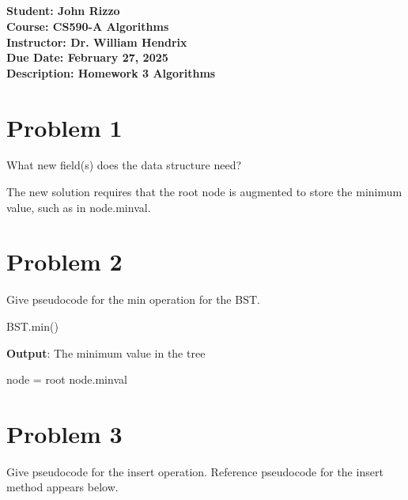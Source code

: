 \documentclass[12pt, letterpaper]{article}
\title{\classname \\ \assignmentdescription}
\author{\studentname}
\date{\duedate}
\newcommand{\studentname}          {John Rizzo           }
\newcommand{\classname}            {CS590-A Algorithms   }
\newcommand{\professorname}        {Dr. William Hendrix  }
\newcommand{\assignmentdescription}{Homework 3 Algorithms}
\newcommand{\duedate}              {February 27, 2025     }
\begin{document}
\noindent
\normalsize \textbf{Student:     \studentname} \\ [5pt]
            \textbf{Course:      \classname} \\ [5pt]
            \textbf{Instructor:  \professorname} \\ [5pt]
            \textbf{Due Date:    \duedate} \\ [5pt]
            \textbf{Description: \assignmentdescription}

\vspace{0.5cm}

\section*{Problem 1}

What new field(s) does the data structure need?

\vspace{0.5cm}
\noindent
The new solution requires that the root node is augmented to store the minimum value, such as in node.minval.

\section*{Problem 2}

Give pseudocode for the min operation for the BST.
\begin{algorithm}
    \caption{BST.min()}
    \begin{minipage}{\textwidth}
        \textbf{Output}: The minimum value in the tree
        \begin{algorithmic}[1]
            \STATE node = root
                \RETURN node.minval
            \ENDIF
        \end{algorithmic}
    \end{minipage}
\end{algorithm}

\break
\section*{Problem 3}

Give pseudocode for the insert operation.  Reference pseudocode for the insert method appears below.
\end{document}
